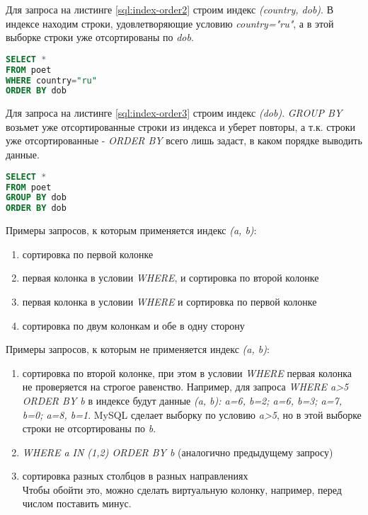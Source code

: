 Для запроса на листинге \ref{sql:index-order2} строим индекс \textit{(country, dob)}. В индексе находим строки, удовлетворяющие условию \textit{country="ru"}, а в этой выборке строки уже отсортированы по \textit{dob}.

\begin{lstlisting}[language=sql, label=sql:index-order2, caption={запрос для index-order}]
SELECT * 
FROM poet
WHERE country="ru" 
ORDER BY dob
\end{lstlisting}


Для запроса на листинге \ref{sql:index-order3} строим индекс \textit{(dob)}. \textit{GROUP BY} возьмет уже отсортированные строки из индекса и уберет повторы, а т.к. строки уже отсортированные - \textit{ORDER BY} всего лишь задаст, в каком порядке выводить данные. 

\begin{lstlisting}[language=sql, label=sql:index-order3, caption={запрос для index-order}]
SELECT *
FROM poet
GROUP BY dob
ORDER BY dob
\end{lstlisting}


Примеры запросов, к которым применяется индекс \textit{(a, b)}:

\begin{enumerate}
\item сортировка по первой колонке
\item первая колонка в условии \textit{WHERE}, и сортировка по второй колонке
\item первая колонка в условии \textit{WHERE} и сортировка по первой колонке
\item сортировка по двум колонкам и обе в одну сторону
\end{enumerate}


Примеры запросов, к которым не применяется индекс \textit{(a, b)}:

\begin{enumerate}
\item сортировка по второй колонке, при этом в условии \textit{WHERE} первая колонка не проверяется на строгое равенство. Например, для запроса \textit{WHERE a>5 ORDER BY b} в индексе будут данные \textit{(a, b): a=6, b=2; a=6, b=3; a=7, b=0; a=8, b=1}. MySQL сделает выборку по условию \textit{a>5}, но в этой выборке строки не отсортированы по \textit{b}.
\item \textit{WHERE a IN (1,2) ORDER BY b} (аналогично предыдущему запросу)
\item сортировка разных столбцов в разных направлениях\\
Чтобы обойти это, можно сделать виртуальную колонку, например, перед числом поставить минус.
\end{enumerate}



